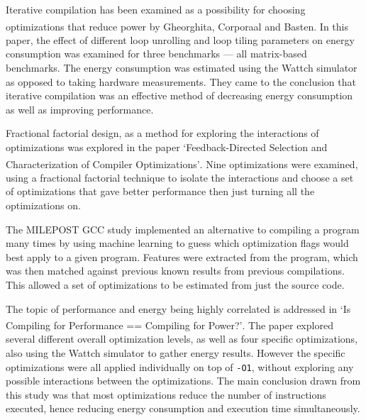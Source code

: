 \documentclass[twocolumn]{article}
\let\oldcite\cite
\renewcommand{\cite}[1]{\textsuperscript{\oldcite{#1}}}
\begin{document}
Iterative compilation has been examined as a possibility for choosing optimizations that reduce power by Gheorghita, Corporaal and Basten\cite{IterativeCompilationForEnergy}. In this paper, the effect of different loop unrolling and loop tiling parameters on energy consumption was examined for three benchmarks --- all matrix-based benchmarks. The energy consumption was estimated using the Wattch simulator as opposed to taking hardware measurements. They came to the conclusion that iterative compilation was an effective method of decreasing energy consumption as well as improving performance.


Fractional factorial design, as a method for exploring the interactions of optimizations was explored in the paper `Feedback-Directed Selection and Characterization of Compiler Optimizations'\cite{IntelPaper}. Nine optimizations were examined, using a fractional factorial technique to isolate the interactions and choose a set of optimizations that gave better performance then just turning all the optimizations on.

The MILEPOST GCC study implemented an alternative to compiling a program many times by using machine learning to guess which optimization flags would best apply to a given program. Features were extracted from the program, which was then matched against previous known results from previous compilations. This allowed a set of optimizations to be estimated from just the source code.

The topic of performance and energy being highly correlated is addressed in `Is Compiling for Performance == Compiling for Power?'\cite{CompilingForPerformancePower}. The paper explored several different overall optimization levels, as well as four specific optimizations, also using the Wattch simulator to gather energy results. However the specific optimizations were all applied individually on top of \texttt{-O1}, without exploring any possible interactions between the optimizations. The main conclusion drawn from this study was that most optimizations reduce the number of instructions executed, hence reducing energy consumption and execution time simultaneously.
\end{document}
